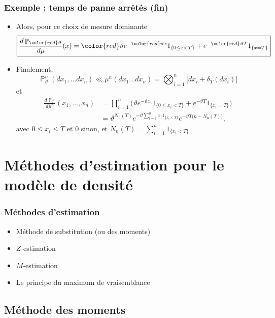 ﻿\documentclass{beamer}
\DeclareMathOperator{\PP}{{\mathbb P}}
\begin{document}
\begin{frame}
\frametitle{Exemple : temps de panne \og arrêtés\fg{} (fin)}
\begin{itemize}
\item Alors, pour ce choix de mesure dominante
$$\boxed{\frac{d\PP_{\color{red}\vartheta}}{d\mu}(x) = {\color{red}\vartheta} e^{-{\color{red}\vartheta} x} 1_{\{0 \leq x < T\}} +  e^{-{\color{red}\vartheta} T}1_{\{x=T\}}}$$
\item Finalement,
$$\PP_\vartheta^n(dx_1,\ldots dx_n)
\ll \mu^n(dx_1 \ldots dx_n) = \bigotimes_{i = 1}^n \big[dx_i +
\delta_{T}(dx_i)\big]
$$
et
\begin{align*}
\frac{d\PP_\vartheta^n}{d\mu^n}(x_1,\ldots, x_n) & = \prod_{i = 1}^n \big(\vartheta e^{-\vartheta x_i} 1_{\{0 \leq x_i < T\}} +  e^{-\vartheta T}1_{\{x_i=T\}}\big) \\
& = \vartheta^{N_n(T)} e^{-\vartheta \sum_{i = 1}^{n}x_i 1_{\{x_i<T\}}}e^{-\vartheta T\big(n-N_n(T)\big)},
\end{align*}
{\color{red} avec $0 \leq x_i \leq T$} et $0$ sinon, et  $N_n(T) = \sum_{i = 1}^n1_{\{x_i < T\}}$.
\end{itemize}
\end{frame}




\section{Méthodes d'estimation pour le modèle de densité}


\begin{frame}
\frametitle{Méthodes d'estimation }
\begin{itemize}
\item Méthode de substitution (ou des moments)
\item $Z$-estimation
\item $M$-estimation
\item Le principe du {\color{red} maximum de vraisemblance}
\end{itemize}
\end{frame}


\subsection{Méthode des moments}
\end{document}
